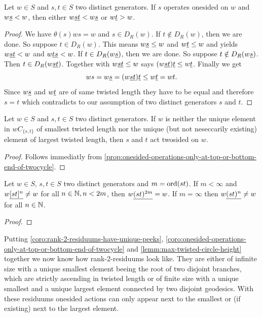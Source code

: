 \begin{prop}
	Let $w \in S$ and $s,t \in S$ two distinct generators. If $s$ operates onesided on $w$ and $w \underline{s} < w$, then either $w \underline{st} < w \underline{s}$ or $w \underline{t} > w$.

	\begin{proof}
		We have $\theta(s)ws = w$ and $s \in D_R(w)$. If $t \notin D_R(w)$, then we are done. So suppose $t \in D_R(w)$. This means $w \underline{s} \leq w$ and $w \underline{t} \leq w$ and \cite[Lemma 3.9]{hultman:comb-twisted-invo} yields $w \underline{st} < w$ and $w \underline{ts} < w$. If $t \in D_R(w \underline{s})$, then we are done. So suppose $t \notin D_R(w \underline{s})$. Then $t \in D_R(w \underline{st})$. Together with $w \underline{st} \leq w$ \cite[Lemma 3.9(2)]{hultman:comb-twisted-invo} says $(w \underline{st}) \underline{t} \leq w \underline{t}$. Finally we get
		$$ ws = w \underline{s} = (w \underline{st}) \underline{t} \leq w \underline{t} = wt.$$
		Since $w \underline{s}$ and $w \underline{t}$ are of same twisted length they have to be equal and therefore $s = t$ which contradicts to our assumption of two distinct generators $s$ and $t$.
	\end{proof}
\end{prop}

\begin{coro}
	Let $w \in S$ and $s,t \in S$ two distinct generators. If $w$ is neither the unique element in $wC_{\{s,t\}}$ of smallest twisted length nor the unique (but not neseccarily existing) element of largest twisted length, then $s$ and $t$ act twosided on $w$.

	\begin{proof}
		Follows immediatly from \ref{prop:onesided-operations-only-at-top-or-bottom-end-of-twocycle}.
	\end{proof}
\end{coro}

\begin{lemm}
	Let $w \in S$, $s,t \in S$ two distinct generators and $m = \operatorname{ord}(st)$. If $m < \infty$ and $w \underline{[st]^n} \neq w$ for all $n \in \mathbb{N}, n < 2m$, then $w \underline{(st)^{2m}} = w$. If $m = \infty$ then $w \underline{(st)^n} \neq w$ for all $n \in \mathbb{N}$.

	\begin{proof}
		\todo
	\end{proof}
\end{lemm}

Putting \ref{coro:rank-2-residuums-have-unique-peeks}, \ref{coro:onesided-operations-only-at-top-or-bottom-end-of-twocycle} and \ref{lemm:max-twisted-circle-height} together we now know how rank-2-residuums look like. They are either of infinite size with a unique smallest element beeing the root of two disjoint branches, which are strictly ascending in twisted length or of finite size with a unique smallest and a unique largest element connected by two disjoint geodesics. With these residuums onesided actions can only appear next to the smallest or (if existing) next to the largest element.

